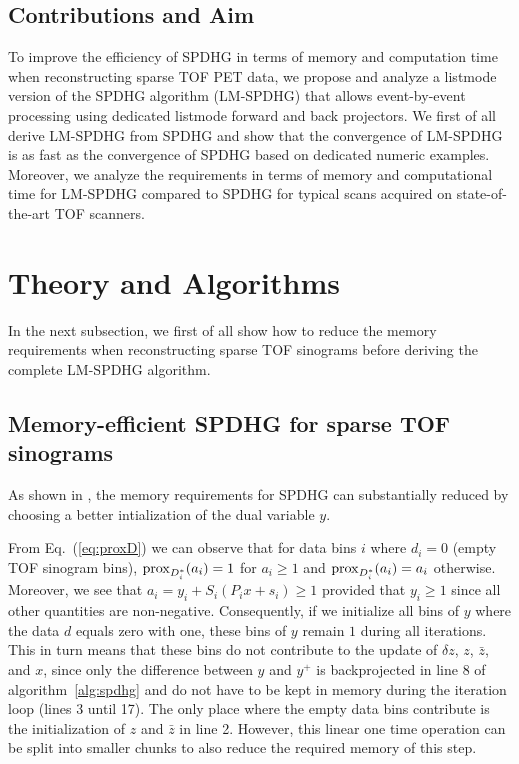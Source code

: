 \subsection*{Contributions and Aim}

To improve the efficiency of SPDHG in terms of memory and computation time when reconstructing 
sparse TOF PET data, we propose and analyze a listmode version of the SPDHG algorithm (LM-SPDHG) 
that allows event-by-event processing using dedicated listmode forward and back projectors.
We first of all derive LM-SPDHG from SPDHG and show that the convergence of LM-SPDHG is as 
fast as the convergence of SPDHG based on dedicated numeric examples.
Moreover, we analyze the requirements in terms of memory and computational time
for LM-SPDHG compared to SPDHG for typical scans acquired on state-of-the-art TOF scanners.


\section{Theory and Algorithms}

In the next subsection, we first of all show how to reduce the memory requirements
when reconstructing sparse TOF sinograms before deriving the complete LM-SPDHG algorithm.

\subsection*{Memory-efficient SPDHG for sparse TOF sinograms}

As shown in \cite{Schramm2021}, the memory requirements for SPDHG can substantially reduced by choosing
a better intialization of the dual variable $y$.

From Eq.~(\ref{eq:proxD}) we can observe that for data bins $i$ where $d_i = 0$ 
(empty TOF sinogram bins), $\operatorname{prox}_{D_i^*}(a_i) = 1$ for $a_i \geq 1$ and $\operatorname{prox}_{D_i^*}(a_i) = a_i$ 
otherwise. 
Moreover, we see that $ a_i = y_i + S_i (P_i x + s_i) \geq 1$ provided that $y_i \geq 1$ 
since all other quantities are non-negative. 
Consequently, if we initialize all bins of $y$ where the data $d$ equals zero with one, 
these bins of $y$ remain $1$ during all iterations. 
This in turn means that these bins do not contribute to the update of $\delta z$, $z$, $\bar{z}$, 
and $x$, since only the difference between
$y$ and $y^+$ is backprojected in line 8 of algorithm~\ref{alg:spdhg} and
do not have to be kept in memory during the iteration loop (lines 3 until 17). 
The only place where the empty data bins contribute is the initialization of $z$ and $\bar{z}$
in line 2.
However, this linear one time operation can be split into smaller chunks to also reduce
the required memory of this step.

